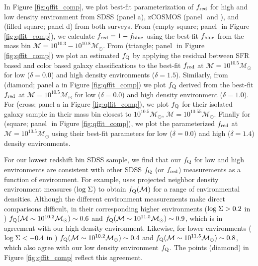 \documentclass{emulateapj}
\begin{document}
In Figure \ref{fig:qffit_comp}, we plot  best-fit parameterization of
$f_{\rm{red}}$ for high and low density environment from SDSS (panel a), zCOSMOS (panel \iovinopanel$ $ and \kovacpanel), and \cite{Peng:2010aa} (filled square; panel d) from both surveys. 
From \cite{Iovino:2010aa} (empty square; panel \iovinopanel$ $ in Figure \ref{fig:qffit_comp}), we calculate $f_{\rm{red}} = 1-f_{\rm{blue}}$
using the best-fit $f_{\rm{blue}}$ from the mass bin $\mathcal{M} =
10^{10.3} - 10^{10.8} \mathcal{M}_{\odot}$. From \cite{Kovac:2014aa} (triangle; panel \kovacpanel$ $ in Figure \ref{fig:qffit_comp})
we plot an estimated $f_{\rm{Q}}$ by applying the residual between SFR
based and color based galaxy classifications to the best-fit
$f_{\rm{red}}$ at $\mathcal{M} = 10^{10.5} \mathcal{M}_{\odot}$ for
low ($\delta = 0.0$) and high density environments ($\delta =
1.5$). Similarly, from \cite{Baldry:2006aa} (diamond; panel a in Figure \ref{fig:qffit_comp}) we plot $f_{\rm{Q}}$
derived from the best-fit $f_{\rm{red}}$ at $\mathcal{M} = 10^{10.5}
\mathcal{M}_{\odot}$ for low ($\delta = 0.0$) and high density
environment ($\delta = 1.0$). For \cite{geha12a} (cross; panel a in Figure \ref{fig:qffit_comp}), we plot $f_{\rm{Q}}$
for their isolated galaxy sample in their mass bin closest to $10^{10.5} \mathcal{M}_{\odot}$, $\mathcal{M} = 10^{10.55} \mathcal{M}_{\odot}$. Finally for \cite{Peng:2010aa} (square; panel \pengpanel$ $ in Figure \ref{fig:qffit_comp}), we plot the parameterized $f_{\rm{red}}$ at $\mathcal{M} = 10^{10.5} \mathcal{M}_{\odot}$ using their best-fit parameters for low ($\delta =0.0$) and high ($\delta = 1.4$) density environments. 

For our lowest redshift bin SDSS sample, we find that our $f_{\rm{Q}}$
for low and high environments are consistent with other SDSS
$f_{\rm{Q}}$ (or $f_{\rm{red}}$) measurements as a function of
environment. For example, \cite{Baldry:2006aa} uses projected neighbor
density environment measures ($\rm{log} \; \Sigma$) to obtain
$f_{\rm{Q}}(\mathcal{M})$ for a range of environmental
densities. Although the different environment measurements make direct
comparisons difficult, in their corresponding higher environments
($\rm{log} \; \Sigma > 0.2$ in \citealt{Baldry:2006aa})
$f_{\rm{Q}}(\mathcal{M} \sim 10^{10.2} \mathcal{M}_{\odot}) \sim 0.6$
and $f_{\rm{Q}}(\mathcal{M} \sim 10^{11.5} \mathcal{M}_{\odot}) \sim
0.9$, which is in agreement with our high density
environment. Likewise, for lower environments ($\rm{log} \; \Sigma <
-0.4$ in \citealt{Baldry:2006aa}) $f_{\rm{Q}}(\mathcal{M} \sim
10^{10.2} \mathcal{M}_{\odot}) \sim 0.4$ and $f_{\rm{Q}}(\mathcal{M}
\sim 10^{11.5} \mathcal{M}_{\odot}) \sim 0.8$, which also agree with
our low density environment $f_{\rm{Q}}$. The \cite{Baldry:2006aa}
points (diamond) in Figure \ref{fig:qffit_comp} reflect this
agreement.
\end{document}
